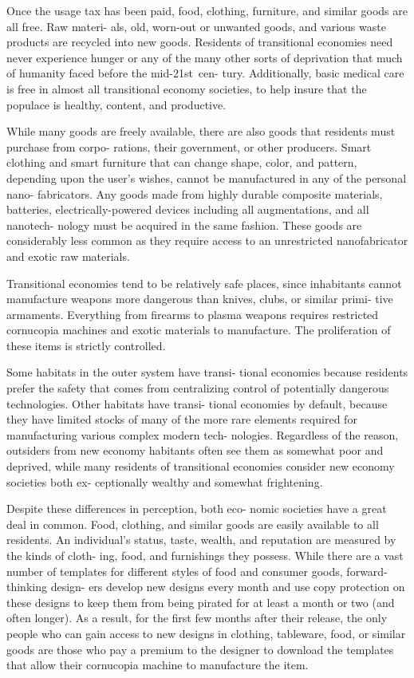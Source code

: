 Once the usage tax has been paid, food, clothing, 
furniture, and similar goods are all free. Raw materi-
als, old, worn-out or unwanted goods, and various 
waste products are recycled into new goods. Residents 
of transitional economies need never experience 
hunger or any of the many other sorts of deprivation 
that much of humanity faced before the mid-21st cen-
tury. Additionally, basic medical care is free in almost 
all transitional economy societies, to help insure that 
the populace is healthy, content, and productive.

While many goods are freely available, there are 
also goods that residents must purchase from corpo-
rations, their government, or other producers. Smart 
clothing and smart furniture that can change shape, 
color, and pattern, depending upon the user's wishes, 
cannot be manufactured in any of the personal nano-
fabricators. Any goods made from highly durable 
composite materials, batteries, electrically-powered 
devices including all augmentations, and all nanotech-
nology must be acquired in the same fashion. These 
goods are considerably less common as they require 
access to an unrestricted nanofabricator and exotic 
raw materials.

Transitional economies tend to be relatively safe 
places, since inhabitants cannot manufacture weapons 
more dangerous than knives, clubs, or similar primi-
tive armaments. Everything from firearms to plasma 
weapons requires restricted cornucopia machines and 
exotic materials to manufacture. The proliferation of 
these items is strictly controlled.

Some habitats in the outer system have transi-
tional economies because residents prefer the safety 
that comes from centralizing control of potentially 
dangerous technologies. Other habitats have transi-
tional economies by default, because they have limited 
stocks of many of the more rare elements required 
for manufacturing various complex modern tech-
nologies. Regardless of the reason, outsiders from new 
economy habitants often see them as somewhat poor 
and deprived, while many residents of transitional 
economies consider new economy societies both ex-
ceptionally wealthy and somewhat frightening.

Despite these differences in perception, both eco-
nomic societies have a great deal in common. Food, 
clothing, and similar goods are easily available to 
all residents. An individual's status, taste, wealth, 
and reputation are measured by the kinds of cloth-
ing, food, and furnishings they possess. While there 
are a vast number of templates for different styles of 
food and consumer goods, forward-thinking design-
ers develop new designs every month and use copy 
protection on these designs to keep them from being 
pirated for at least a month or two (and often longer). 
As a result, for the first few months after their release, 
the only people who can gain access to new designs in 
clothing, tableware, food, or similar goods are those 
who pay a premium to the designer to download the 
templates that allow their cornucopia machine to 
manufacture the item.

